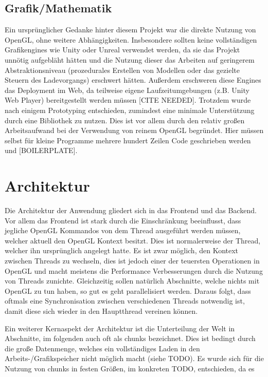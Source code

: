 \subsection{Grafik/Mathematik}
Ein ursprünglicher Gedanke hinter diesem Projekt war die direkte Nutzung von OpenGL, ohne weitere Abhängigkeiten. Insbesondere sollten keine vollständigen Grafikengines wie Unity oder Unreal verwendet werden, da sie das Projekt unnötig aufgebläht hätten und die Nutzung dieser das Arbeiten auf geringerem Abstraktionsniveau (prozedurales Erstellen von Modellen oder das gezielte Steuern des Ladevorgangs) erschwert hätten. Außerdem erschweren diese Engines das Deployment im Web, da teilweise eigene Laufzeitumgebungen (z.B. Unity Web Player) bereitgestellt werden müssen [CITE NEEDED]. Trotzdem wurde nach einigem Prototyping entschieden, zumindest eine minimale Unterstützung durch eine Bibliothek zu nutzen. Dies ist vor allem durch den relativ großen Arbeitsaufwand bei der Verwendung von reinem OpenGL begründet. Hier müssen selbst für kleine Programme mehrere hundert Zeilen Code geschrieben werden und [BOILERPLATE].



\section{Architektur}
Die Architektur der Anwendung gliedert sich in das Frontend und das Backend. Vor allem das Frontend ist stark durch die Einschränkung beeinflusst, dass jegliche OpenGL Kommandos von dem Thread ausgeführt werden müssen, welcher aktuell den OpenGL Kontext besitzt. Dies ist normalerweise der Thread, welcher ihn ursprünglich angelegt hatte. Es ist zwar möglich, den Kontext zwischen Threads zu wechseln, dies ist jedoch einer der teuersten Operationen in OpenGL und macht meistens die Performance Verbesserungen durch die Nutzung von Threads zunichte. Gleichzeitig sollen natürlich Abschnitte, welche nichts mit OpenGL zu tun haben, so gut es geht parallelisiert werden. Daraus folgt, dass oftmals eine Synchronisation zwischen verschiedenen Threads notwendig ist, damit diese sich wieder in den Hauptthread vereinen können.

Ein weiterer Kernaspekt der Architektur ist die Unterteilung der Welt in Abschnitte, im folgenden auch oft als chunks bezeichnet. Dies ist bedingt durch die große Datenmenge, welches ein vollständiges Laden in den Arbeits-/Grafikspeicher nicht möglich macht (siehe TODO). Es wurde sich für die Nutzung von chunks in festen Größen, im konkreten TODO, entschieden, da es 

